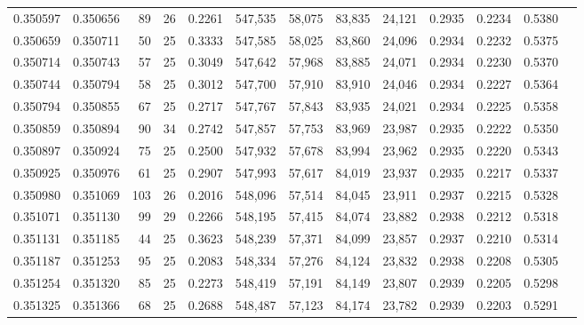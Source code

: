 \begin{tabular}{rrrrrrrrrrrrr}
0.350597 & 0.350656 &    89 &  26 &                                     0.2261 & 547,535 &  58,075 &  83,835 &  24,121 & 0.2935 & 0.2234 & 0.5380 \\
0.350659 & 0.350711 &    50 &  25 &                                     0.3333 & 547,585 &  58,025 &  83,860 &  24,096 & 0.2934 & 0.2232 & 0.5375 \\
0.350714 & 0.350743 &    57 &  25 &                                     0.3049 & 547,642 &  57,968 &  83,885 &  24,071 & 0.2934 & 0.2230 & 0.5370 \\
0.350744 & 0.350794 &    58 &  25 &                                     0.3012 & 547,700 &  57,910 &  83,910 &  24,046 & 0.2934 & 0.2227 & 0.5364 \\
0.350794 & 0.350855 &    67 &  25 &                                     0.2717 & 547,767 &  57,843 &  83,935 &  24,021 & 0.2934 & 0.2225 & 0.5358 \\
0.350859 & 0.350894 &    90 &  34 &                                     0.2742 & 547,857 &  57,753 &  83,969 &  23,987 & 0.2935 & 0.2222 & 0.5350 \\
0.350897 & 0.350924 &    75 &  25 &                                     0.2500 & 547,932 &  57,678 &  83,994 &  23,962 & 0.2935 & 0.2220 & 0.5343 \\
0.350925 & 0.350976 &    61 &  25 &                                     0.2907 & 547,993 &  57,617 &  84,019 &  23,937 & 0.2935 & 0.2217 & 0.5337 \\
0.350980 & 0.351069 &   103 &  26 &                                     0.2016 & 548,096 &  57,514 &  84,045 &  23,911 & 0.2937 & 0.2215 & 0.5328 \\
0.351071 & 0.351130 &    99 &  29 &                                     0.2266 & 548,195 &  57,415 &  84,074 &  23,882 & 0.2938 & 0.2212 & 0.5318 \\
0.351131 & 0.351185 &    44 &  25 &                                     0.3623 & 548,239 &  57,371 &  84,099 &  23,857 & 0.2937 & 0.2210 & 0.5314 \\
0.351187 & 0.351253 &    95 &  25 &                                     0.2083 & 548,334 &  57,276 &  84,124 &  23,832 & 0.2938 & 0.2208 & 0.5305 \\
0.351254 & 0.351320 &    85 &  25 &                                     0.2273 & 548,419 &  57,191 &  84,149 &  23,807 & 0.2939 & 0.2205 & 0.5298 \\
0.351325 & 0.351366 &    68 &  25 &                                     0.2688 & 548,487 &  57,123 &  84,174 &  23,782 & 0.2939 & 0.2203 & 0.5291 \\

\end{tabular}
